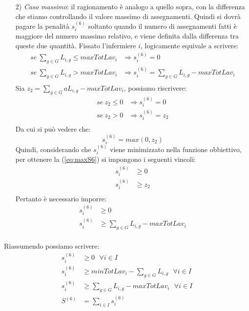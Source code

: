 \begin{itemize}
\item [2)] \textit{Caso massimo}: il ragionamento è analogo a quello sopra, con la differenza che stiamo controllando il valore massimo di assegnamenti. Quindi si dovrà pagare la penalità $s^{(6)}_{i}$ soltanto quando il numero di assegnamenti fatti è maggiore del numero massimo relativo, e viene definita dalla differenza tra queste due quantità. Fissato l'infermiere $i$, logicamente equivale a scrivere:
\begin{equation}
\begin{split}
se ~ \sum_{g \in G} L_{i, g} \leq maxTotLav_i &\Longrightarrow s^{(6)}_{i} = 0\\
se ~ \sum_{g \in G} L_{i, g} > maxTotLav_i &\Longrightarrow s^{(6)}_{i} = \sum_{g \in G} L_{i, g} - maxTotLav_i\\
\end{split}
\end{equation}
Sia $z_2 = \sum_{g \in G} aL_{i, g} - maxTotLav_i$, possiamo riscrivere:
\begin{equation}
\begin{split}
se ~ z_2 \leq 0 &\Longrightarrow s^{(6)}_{i} = 0 \\
se ~ z_2 > 0 &\Longrightarrow s^{(6)}_{i} = z_2 \\
\end{split}
\end{equation}
Da cui si può vedere che:
\begin{equation}
\label{eq:maxS6}
s^{(6)}_{i} = max(0, z_2)
\end{equation}
Quindi, considerando che $s^{(6)}_{i}$ viene minimizzato nella funzione obbiettivo, per ottenere la (\ref{eq:maxS6}) si impongono i seguenti vincoli:
\begin{equation}
\begin{split}
s^{(6)}_{i} &\geq 0 \\
s^{(6)}_{i} &\geq z_2 \\
\end{split}
\end{equation}
Pertanto è necessario imporre:
\begin{equation}
\begin{split}
s^{(6)}_{i} &\geq 0 \\
s^{(6)}_{i} &\geq \sum_{g \in G} L_{i, g} - maxTotLav_i \\
\end{split}
\end{equation}
\end{itemize}

Riassumendo possiamo scrivere:
\begin{equation}
\begin{split}
s^{(6)}_{i} &\geq 0 ~~~ \forall i \in I \\
s^{(6)}_{i} &\geq minTotLav_i - \sum_{g \in G} L_{i, g} ~~~ \forall i \in I \\
s^{(6)}_{i} &\geq \sum_{g \in G} L_{i, g} - maxTotLav_i  ~~~ \forall i \in I \\
S^{(6)} &= \sum_{i \in I} s^{(6)}_{i}
\end{split}
\end{equation}

